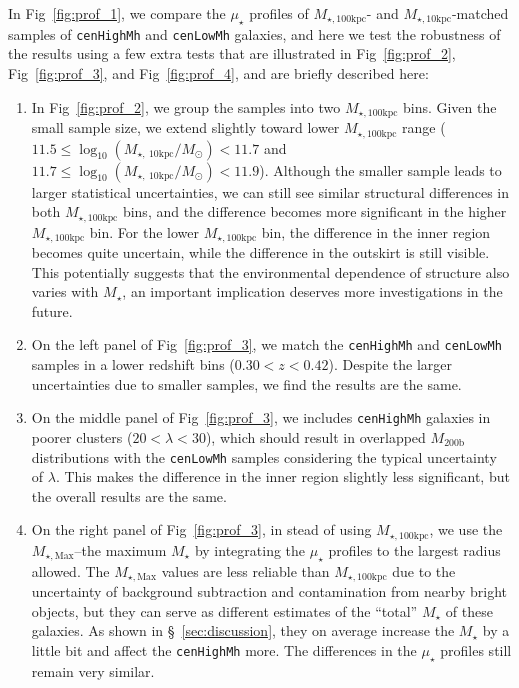 \documentclass[a4paper,fleqn,usenatbib]{mnras}
\def\rbcg{\texttt{cenHighMh}}
\def\nbcg{\texttt{cenLowMh}}
\def\mstar{{$M_{\star}$}}
\def\mhalo{{$M_{\mathrm{200b}}$}}
\def\minn{{$M_{\star,10\mathrm{kpc}}$}}
\def\mtot{{$M_{\star,100\mathrm{kpc}}$}}
\def\mmax{{$M_{\star,\mathrm{Max}}$}}
\def\mden{{$\mu_{\star}$}}
\begin{document}
    In Fig~\ref{fig:prof_1}, we compare the \mden{} profiles of \mtot{}- and 
    \minn{}-matched samples of \rbcg{} and \nbcg{} galaxies, and here we test the 
    robustness of the results using a few extra tests that are illustrated in
    Fig~\ref{fig:prof_2}, Fig~\ref{fig:prof_3}, and Fig~\ref{fig:prof_4}, and 
    are briefly described here:   
    
    \begin{enumerate}
        
        \item In Fig~\ref{fig:prof_2}, we group the samples into two \mtot{} bins. 
            Given the small sample size, we extend slightly toward lower \mtot{} range 
            ($11.5 \leq \log_{10} (M_{\star,\ 10\mathrm{kpc}}/M_{\odot}) < 11.7$ and 
             $11.7 \leq \log_{10} (M_{\star,\ 10\mathrm{kpc}}/M_{\odot}) < 11.9$). 
            Although the smaller sample leads to larger statistical uncertainties, 
            we can still see similar structural differences in both \mtot{} bins, 
            and the difference becomes more significant in the higher \mtot{} bin.  
            For the lower \mtot{} bin, the difference in the inner region becomes 
            quite uncertain, while the difference in the outskirt is still visible. 
            This potentially suggests that the environmental dependence of structure 
            also varies with \mstar{}, an important implication deserves more 
            investigations in the future.   

        \item On the left panel of Fig~\ref{fig:prof_3}, we match the \rbcg{} and 
            \nbcg{} samples in a lower redshift bins ($0.30 < z < 0.42$).
            Despite the larger uncertainties due to smaller samples, we find the 
            results are the same.
            
        \item On the middle panel of Fig~\ref{fig:prof_3}, we includes \rbcg{} 
            galaxies in poorer clusters ($20 < \lambda < 30$), which should result 
            in overlapped \mhalo{} distributions with the \nbcg{} samples 
            considering the typical uncertainty of $\lambda$.
            This makes the difference in the inner region slightly less significant, 
            but the overall results are the same. 
             
        \item On the right panel of Fig~\ref{fig:prof_3}, in stead of using \mtot{}, 
            we use the \mmax{}--the maximum \mstar{} by integrating the \mden{} 
            profiles to the largest radius allowed.  
            The \mmax{} values are less reliable than \mtot{} due to the 
            uncertainty of background subtraction and contamination from nearby 
            bright objects, but they can serve as different estimates of the ``total''
            \mstar{} of these galaxies.
            As shown in \S~\ref{sec:discussion}, they on average increase
            the \mstar{} by a little bit and affect the \rbcg{} more.
            The differences in the \mden{} profiles still remain very similar.
      
    \end{enumerate}
    
\end{document}
